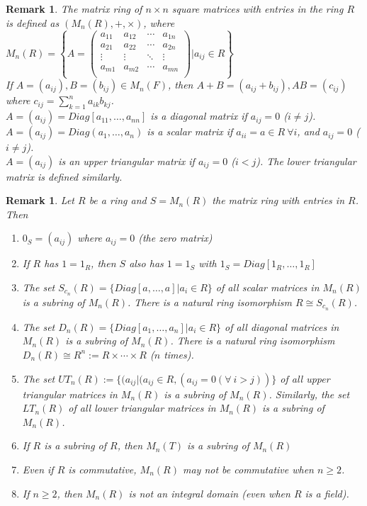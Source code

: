 \documentclass[a4paper,8pt]{article}
\theoremstyle{theorem}
\newtheorem{remark}[theorem]{Remark}
\begin{document}
\begin{remark}
The {{\color{blue} matrix ring of $n \times n$ square matrices with entries in the ring $R$}} is defined as $(M_n(R), +, \times)$, where\\
$M_n(R) = \left\{A=\begin{pmatrix}
a_{11} & a_{12} & \cdots & a_{1n}\\
a_{21} & a_{22} & \cdots & a_{2n}\\
\vdots & \vdots & \ddots & \vdots\\
a_{m1} & a_{m2} & \cdots & a_{mn}\\
\end{pmatrix} | a_{ij} \in R \right\}$\\
If $A = (a_{ij}), B = (b_{ij}) \in M_n(F)$, then $A+B=(a_{ij} + b_{ij}), AB = (c_{ij})$ where $c_{ij} = \sum_{k=1}^{n} a_{ik} b_{kj}$.\\
$A=(a_{ij}) = Diag[a_{11}, \ldots, a_{nn}]$ is a diagonal matrix if $a_{ij} = 0$ ($i \neq j$).\\
$A=(a_{ij}) = Diag(a_1, \ldots, a_n)$ is a scalar matrix if $a_{ii} = a \in R \ \forall i$, and $a_{ij} = 0$ ($i \neq j$).\\
$A=(a_{ij})$ is an upper triangular matrix if $a_{ij}=0$ ($i < j$). The lower triangular matrix is defined similarly.\\
\end{remark}


\begin{remark}
Let $R$ be a ring and $S = M_n(R)$ the matrix ring with entries in $R$. Then
\begin{enumerate}[label=(\roman*)]
\item $0_S=(a_{ij})$ where $a_{ij} = 0$ (the zero matrix)
\item If $R$ has $1 = 1_R$, then $S$ also has $1 = 1_S$ with $1_S = Diag[1_R, \ldots, 1_R]$
\item The set $S_{c_n}(R) = \{Diag[a, \ldots, a] | a_i \in R\}$ of all scalar matrices in $M_n(R)$ is a subring of $M_n(R)$. There is a natural ring isomorphism $R \cong S_{c_n}(R)$.
\item The set $D_n(R) = \{Diag[a_1, \ldots, a_n] | a_i \in R\}$ of all diagonal matrices in $M_n(R)$ is a subring of $M_n(R)$. There is a natural ring isomorphism $D_n(R) \cong R^n := R \times \cdots \times R $ ($n$ times).
\item The set $UT_n(R):= \{(a_{ij} | (a_{ij} \in R, (a_{ij} = 0 (\forall \ i > j))\}$ of all upper triangular matrices in $M_n(R)$ is a subring of $M_n(R)$. Similarly, the set $LT_n(R)$ of all lower triangular matrices in $M_n(R)$ is a subring of $M_n(R)$.
\item If $R$ is a subring of $R$, then $M_n(T)$ is a subring of $M_n(R)$
\item Even if $R$ is commutative, $M_n(R)$ may not be commutative when $n \geq 2$.
\item If $n \geq 2$, then $M_n(R)$ is not an integral domain (even when $R$ is a field).
\end{enumerate}
\end{remark}
\end{document}
